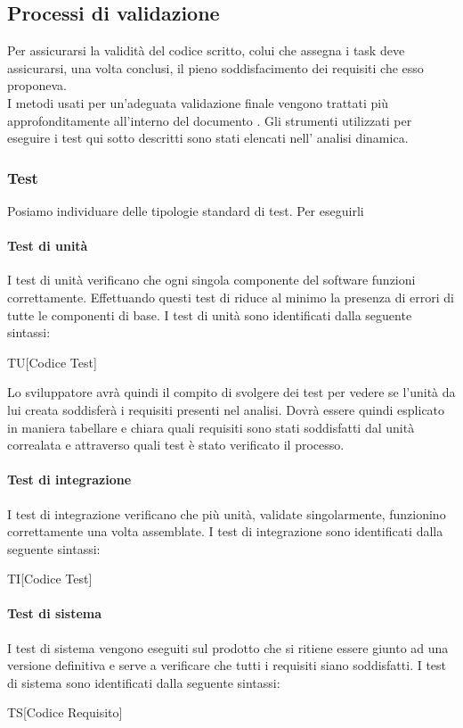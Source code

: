 \subsection{Processi di validazione}
Per assicurarsi la validità del codice scritto, colui che assegna i task deve assicurarsi, una volta conclusi, il pieno soddisfacimento dei requisiti che esso proponeva. \\
I metodi usati per un'adeguata validazione finale vengono trattati più approfonditamente all'interno del documento \pianoDiQualifica.
Gli strumenti utilizzati per eseguire i test qui sotto descritti sono stati elencati nell' analisi dinamica.

\subsubsection{Test}
Posiamo individuare delle tipologie standard di test.
Per eseguirli 

\paragraph{Test di unità}
I test di unità verificano che ogni singola componente del software funzioni correttamente. Effettuando questi test di riduce al minimo la presenza di errori di tutte le componenti di base. I test di unità sono identificati dalla seguente sintassi:
\begin{center}
  TU[Codice Test]
\end{center}
Lo sviluppatore avrà quindi il compito di svolgere dei test per vedere se l'unità da lui creata soddisferà i requisiti presenti nel analisi. Dovrà essere quindi esplicato in maniera tabellare e chiara quali requisiti sono stati soddisfatti dal unità correalata e attraverso quali test è stato verificato il processo.



\paragraph{Test di integrazione}
I test di integrazione verificano che più unità, validate singolarmente, funzionino
correttamente una volta assemblate. I test di integrazione sono identificati dalla seguente sintassi:
\begin{center}
  TI[Codice Test]
\end{center}

\paragraph{Test di sistema}
I test di sistema vengono eseguiti sul prodotto che si ritiene essere giunto ad
una versione definitiva e serve a verificare che tutti i requisiti siano soddisfatti. I test di sistema sono identificati dalla seguente sintassi:
\begin{center}
  TS[Codice Requisito]
\end{center}

